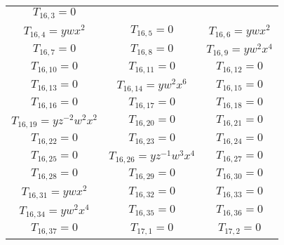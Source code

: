 \documentclass[12pt]{memoireuqam1.3}
\begin{document}
\begin{longtable}{|c|c|c|}
$T_{16,3}= 0$\\

$T_{16,4}= ywx^2$&

$T_{16,5}= 0$&

$T_{16,6}= ywx^2$\\

$T_{16,7}= 0$&

$T_{16,8}= 0$&

$T_{16,9}= yw^2x^4$\\

$T_{16,10}= 0$&

$T_{16,11}= 0$&

$T_{16,12}= 0$\\

$T_{16,13}= 0$&

$T_{16,14}= yw^2x^6$&

$T_{16,15}= 0$\\

$T_{16,16}= 0$&

$T_{16,17}= 0$&

$T_{16,18}= 0$\\

$T_{16,19}= yz^{-2}w^2x^2$&

$T_{16,20}= 0$&

$T_{16,21}= 0$\\

$T_{16,22}= 0$&

$T_{16,23}= 0$&

$T_{16,24}= 0$\\

$T_{16,25}= 0$&

$T_{16,26}= yz^{-1}w^3x^4$&

$T_{16,27}= 0$\\

$T_{16,28}= 0$&

$T_{16,29}= 0$&

$T_{16,30}= 0$\\

$T_{16,31}= ywx^2$&

$T_{16,32}= 0$&

$T_{16,33}= 0$\\

$T_{16,34}= yw^2x^4$&

$T_{16,35}= 0$&

$T_{16,36}= 0$\\

$T_{16,37}= 0$&

$T_{17,1}= 0$&

$T_{17,2}= 0$\\


\end{longtable}
\end{document}
